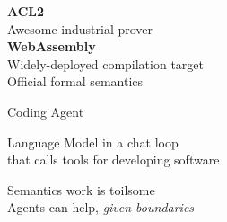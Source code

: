 \begin{slide}
\end{slide}

\begin{slide}
  \vfill
  \begin{minipage}{.8\textwidth}\LARGE
    \textbf{ACL2}\\
    Awesome industrial prover
    \\[6mm]
    \textbf{WebAssembly}\\
    Widely-deployed compilation target\\
    Official formal semantics
  \end{minipage}
  \vfill
\end{slide}

\begin{slide}
  \vspace*{8mm}
  \begin{center}
    {\Huge Coding Agent}\\[1mm]
  \end{center}
  \vspace*{6mm}
  \begin{center}\LARGE
    Language Model in a chat loop\\
    that calls tools for developing software
  \end{center}
  \vfill
\end{slide}

\begin{slide}
  \vspace*{14mm}
  \begin{center}\LARGE
    Semantics work is toilsome\\[6mm]
    Agents can help, \emph{given boundaries}
  \end{center}
\end{slide}

\begin{slide}
  \begin{center}
  \end{center}
\end{slide}

